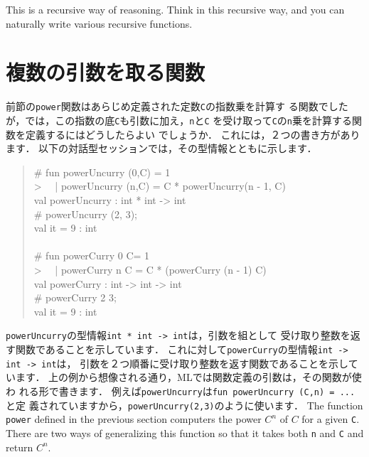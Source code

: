 \documentclass{jbook}
\newif\ifjp
\newcommand{\txt}[2]{#1}
\begin{document}
	This is a recursive way of reasoning.
	Think in this recursive way, and you can naturally write various
recursive functions.
\fi%

\section{\txt{複数の引数を取る関数}{Functions with multiple arguments}}
\label{sec:tutorialMultiargfun}

\ifjp%
	前節の{\tt power}関数はあらじめ定義された定数{\tt C}の指数乗を計算す
る関数でしたが，では，この指数の底{\tt C}も引数に加え，{\tt n}と{\tt C}
を受け取って{\tt C}の{\tt n}乗を計算する関数を定義するにはどうしたらよい
でしょうか．
	これには，２つの書き方があります．
	以下の対話型セッションでは，その型情報とともに示します．
\begin{tt}
\begin{quote}
\# fun powerUncurry (0,C) = 1\\
> \ \ | powerUncurry (n,C) = C * powerUncurry(n - 1, C)\\
val powerUncurry : int * int -> int\\
\# powerUncurry (2, 3);\\
val it = 9 : int\\
\ \\
\# fun powerCurry 0 C= 1\\
> \ \ | powerCurry n C = C * (powerCurry (n - 1) C)\\
val powerCurry : int -> int -> int\\
\# powerCurry 2 3;\\
val it = 9 : int
\end{quote}
\end{tt}
	{\tt powerUncurry}の型情報{\tt int * int -> int}は，引数を組として
受け取り整数を返す関数であることを示しています．
	これに対して{\tt powerCurry}の型情報{\tt int -> int -> int}は，
引数を２つ順番に受け取り整数を返す関数であることを示しています．
	上の例から想像される通り，MLでは関数定義の引数は，その関数が使わ
れる形で書きます．
	例えば{\tt powerUncurry}は{\tt fun powerUncurry (C,n) = ...}と定
義されていますから，{\tt powerUncurry(2,3)}のように使います．
\else%
	The function {\tt power} defined in the previous section
computers the power $C^n$ of $C$ for a given {\tt C}.
	There are two ways of generalizing this function so that it takes 
both {\tt n} and {\tt C} and return $C^n$.
\end{document}
